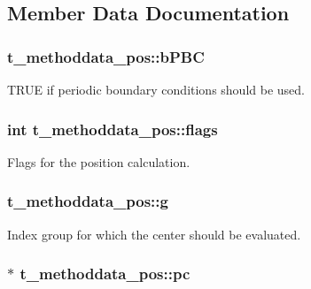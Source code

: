 \subsection{\-Member \-Data \-Documentation}
\hypertarget{structt__methoddata__pos_a053355e9fbdf5b3983c7f8e52f8da888}{
\subsubsection[{b\-P\-B\-C}]{ {\bf t\-\_\-methoddata\-\_\-pos\-::b\-P\-B\-C}}}\label{structt__methoddata__pos_a053355e9fbdf5b3983c7f8e52f8da888}
\-T\-R\-U\-E if periodic boundary conditions should be used. \hypertarget{structt__methoddata__pos_ab099252fc0459bdbbc9ed29536b9ad82}{
\subsubsection[{flags}]{\setlength{\rightskip}{0pt plus 5cm}int {\bf t\-\_\-methoddata\-\_\-pos\-::flags}}}\label{structt__methoddata__pos_ab099252fc0459bdbbc9ed29536b9ad82}
\-Flags for the position calculation. \hypertarget{structt__methoddata__pos_a3a688be7bac9b2672f051f3270e42d2b}{
\subsubsection[{g}]{ {\bf t\-\_\-methoddata\-\_\-pos\-::g}}}\label{structt__methoddata__pos_a3a688be7bac9b2672f051f3270e42d2b}
\-Index group for which the center should be evaluated. \hypertarget{structt__methoddata__pos_a218a811180eada9aeecb70b4d657ac44}{
\subsubsection[{pc}]{$\ast$ {\bf t\-\_\-methoddata\-\_\-pos\-::pc}}}\label{structt__methoddata__pos_a218a811180eada9aeecb70b4d657ac44}
